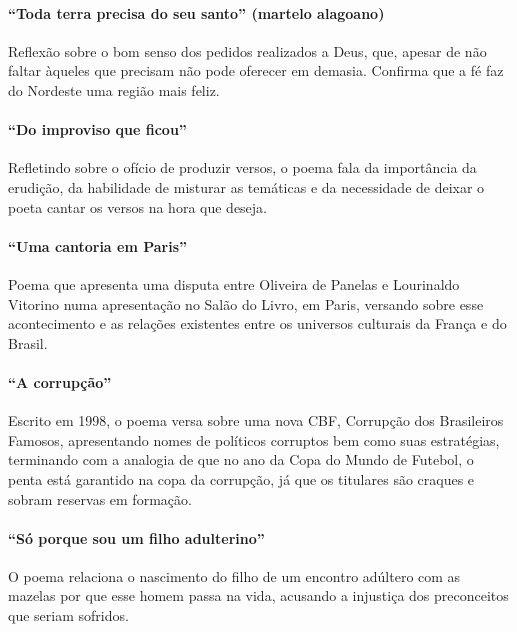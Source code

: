 \paragraph{``Toda terra precisa do seu santo'' (martelo alagoano)}

Reflexão sobre o bom senso dos pedidos realizados a Deus, que, 
apesar de não faltar àqueles que precisam não pode oferecer em demasia.
Confirma que a fé faz do Nordeste uma região mais feliz.

\paragraph{``Do improviso que ficou''}

Refletindo sobre o ofício de produzir versos, o poema fala da
importância da erudição, da habilidade de misturar as temáticas e da
necessidade de deixar o poeta cantar os versos na hora que deseja.

\paragraph{``Uma cantoria em Paris''}

Poema que apresenta uma disputa entre Oliveira de Panelas e Lourinaldo Vitorino numa
apresentação no Salão do Livro, em Paris, versando sobre esse
acontecimento e as relações existentes entre os universos culturais da
França e do Brasil.

\paragraph{``A corrupção''}

Escrito em 1998, o poema versa sobre uma nova CBF, Corrupção dos
Brasileiros Famosos, apresentando nomes de políticos corruptos bem como
suas estratégias, terminando com a analogia de que no ano da Copa do
Mundo de Futebol, o penta está garantido na copa da corrupção, já que
os titulares são craques e sobram reservas em formação.

\paragraph{``Só porque sou um filho adulterino''}

O poema relaciona o nascimento do filho de um encontro adúltero com as
mazelas por que esse homem passa na vida, acusando a injustiça dos preconceitos
que seriam sofridos.

